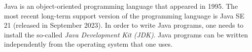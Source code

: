 
Java is an object-oriented programming language that appeared in 1995. The most recent long-term support version of the programming language is Java SE 21 (released in September 2023). In order to write Java programs, one needs to install the so-called \emph{Java Development Kit (JDK)}. Java programs can be written independently from the operating system that one uses.